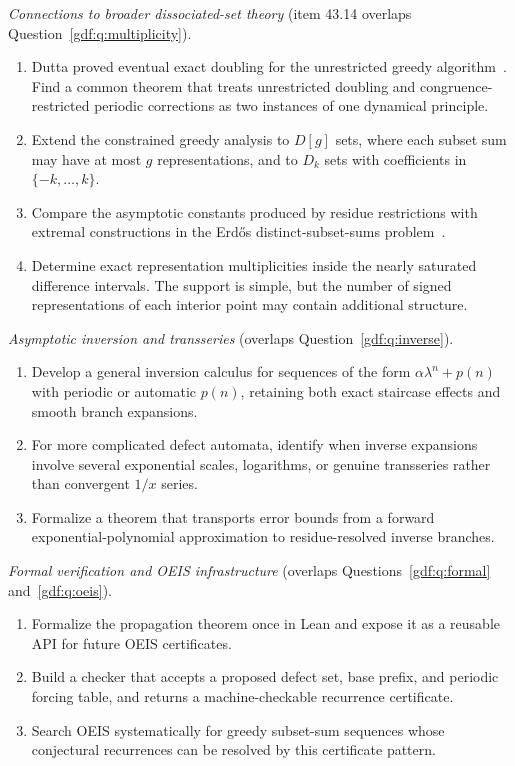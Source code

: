 \documentclass[11pt,a4paper]{article}
\numberwithin{equation}{section}
\theoremstyle{definition}
\theoremstyle{remark}
\theoremstyle{plain}
\begin{document}
\emph{Connections to broader dissociated-set theory} (item 43.14 overlaps
Question~\ref{gdf:q:multiplicity}).
\begin{enumerate}[label=43.\arabic*,resume]
\item Dutta proved eventual exact doubling for the unrestricted greedy
      algorithm~\cite{Dutta2026}.  Find a common theorem that treats
      unrestricted doubling and congruence-restricted periodic corrections as
      two instances of one dynamical principle.
\item Extend the constrained greedy analysis to $D[g]$ sets, where each subset
      sum may have at most $g$ representations, and to $D_k$ sets with
      coefficients in $\{-k,\ldots,k\}$.
\item Compare the asymptotic constants produced by residue restrictions with
      extremal constructions in the Erd\H{o}s distinct-subset-sums
      problem~\cite{Bohman1998,DubroffFoxXu2021,Steinerberger2023}.
\item Determine exact representation multiplicities inside the nearly
      saturated difference intervals.  The support is simple, but the number
      of signed representations of each interior point may contain additional
      structure.
\end{enumerate}

\emph{Asymptotic inversion and transseries} (overlaps
Question~\ref{gdf:q:inverse}).
\begin{enumerate}[label=43.\arabic*,resume]
\item Develop a general inversion calculus for sequences of the form
      $\alpha\lambda^n+p(n)$ with periodic or automatic $p(n)$, retaining both
      exact staircase effects and smooth branch expansions.
\item For more complicated defect automata, identify when inverse expansions
      involve several exponential scales, logarithms, or genuine transseries
      rather than convergent $1/x$ series.
\item Formalize a theorem that transports error bounds from a forward
      exponential-polynomial approximation to residue-resolved inverse
      branches.
\end{enumerate}

\emph{Formal verification and OEIS infrastructure} (overlaps
Questions~\ref{gdf:q:formal} and~\ref{gdf:q:oeis}).
\begin{enumerate}[label=43.\arabic*,resume]
\item Formalize the propagation theorem once in Lean and expose it as a
      reusable API for future OEIS certificates.
\item Build a checker that accepts a proposed defect set, base prefix, and
      periodic forcing table, and returns a machine-checkable recurrence
      certificate.
\item Search OEIS systematically for greedy subset-sum sequences whose
      conjectural recurrences can be resolved by this certificate pattern.
\end{enumerate}
\end{document}
